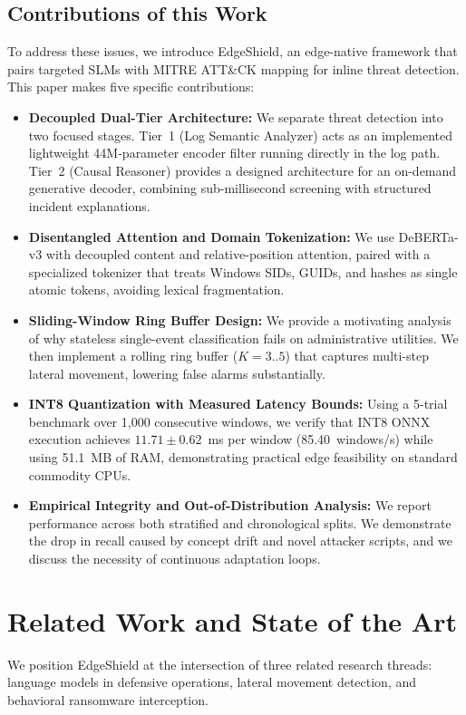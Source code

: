 \documentclass[10pt,journal,compsoc]{IEEEtran}
\begin{document}
\subsection{Contributions of this Work}
To address these issues, we introduce EdgeShield, an edge-native framework that pairs targeted SLMs with MITRE ATT\&CK mapping for inline threat detection. This paper makes five specific contributions:
\begin{itemize}
    \item \textbf{Decoupled Dual-Tier Architecture:} We separate threat detection into two focused stages. Tier~1 (Log Semantic Analyzer) acts as an implemented lightweight 44M-parameter encoder filter running directly in the log path. Tier~2 (Causal Reasoner) provides a designed architecture for an on-demand generative decoder, combining sub-millisecond screening with structured incident explanations.
    \item \textbf{Disentangled Attention and Domain Tokenization:} We use DeBERTa-v3 with decoupled content and relative-position attention, paired with a specialized tokenizer that treats Windows SIDs, GUIDs, and hashes as single atomic tokens, avoiding lexical fragmentation.
    \item \textbf{Sliding-Window Ring Buffer Design:} We provide a motivating analysis of why stateless single-event classification fails on administrative utilities. We then implement a rolling ring buffer ($K=3..5$) that captures multi-step lateral movement, lowering false alarms substantially.
    \item \textbf{INT8 Quantization with Measured Latency Bounds:} Using a 5-trial benchmark over 1,000 consecutive windows, we verify that INT8 ONNX execution achieves $11.71 \pm 0.62$~ms per window (85.40~windows/s) while using 51.1~MB of RAM, demonstrating practical edge feasibility on standard commodity CPUs.
    \item \textbf{Empirical Integrity and Out-of-Distribution Analysis:} We report performance across both stratified and chronological splits. We demonstrate the drop in recall caused by concept drift and novel attacker scripts, and we discuss the necessity of continuous adaptation loops.
\end{itemize}

\section{Related Work and State of the Art}
We position EdgeShield at the intersection of three related research threads: language models in defensive operations, lateral movement detection, and behavioral ransomware interception.
\end{document}
